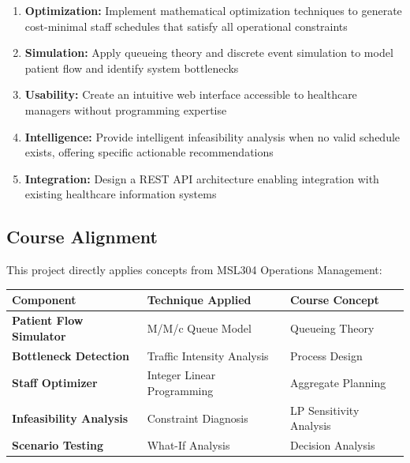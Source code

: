 \documentclass[12pt,a4paper]{article}
\begin{document}
\begin{enumerate}[leftmargin=2em]
    \item \textbf{Optimization:} Implement mathematical optimization techniques to generate cost-minimal staff schedules that satisfy all operational constraints
    
    \item \textbf{Simulation:} Apply queueing theory and discrete event simulation to model patient flow and identify system bottlenecks
    
    \item \textbf{Usability:} Create an intuitive web interface accessible to healthcare managers without programming expertise
    
    \item \textbf{Intelligence:} Provide intelligent infeasibility analysis when no valid schedule exists, offering specific actionable recommendations
    
    \item \textbf{Integration:} Design a REST API architecture enabling integration with existing healthcare information systems
\end{enumerate}

\subsection{Course Alignment}
\label{subsec:alignment}

This project directly applies concepts from MSL304 Operations Management:

\begin{center}
\begin{tabular}{>{\bfseries}m{3.5cm} m{4.5cm} m{5cm}}
\toprule
Component & Technique Applied & Course Concept \\
\midrule
Patient Flow Simulator & M/M/c Queue Model & Queueing Theory \\
Bottleneck Detection & Traffic Intensity Analysis & Process Design \\
Staff Optimizer & Integer Linear Programming & Aggregate Planning \\
Infeasibility Analysis & Constraint Diagnosis & LP Sensitivity Analysis \\
Scenario Testing & What-If Analysis & Decision Analysis \\
\bottomrule
\end{tabular}
\end{center}

\newpage
\end{document}
